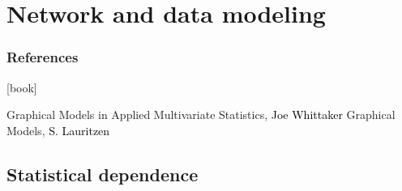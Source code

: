 \section{Network and data modeling}

\begin{frame}
  \frametitle{References}

    \begin{thebibliography}{99}
      [book]

     Graphical Models in Applied Multivariate Statistics, \textcolor{black}{Joe Whittaker}
     Graphical Models, \textcolor{black}{S. Lauritzen}
    \end{thebibliography}

\end{frame}

\subsection{Statistical dependence}

